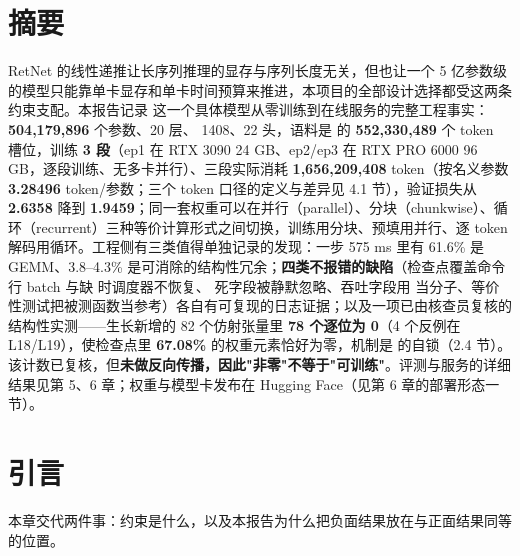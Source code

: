 \documentclass[11pt,openany]{ctexart}
\begin{document}
\clearpage


\section*{摘要}


RetNet 的线性递推让长序列推理的显存与序列长度无关，但也让一个 5 亿参数级的模型只能靠单卡显存和单卡时间预算来推进，本项目的全部设计选择都受这两条约束支配。本报告记录  这一个具体模型从零训练到在线服务的完整工程事实：\textbf{504,179,896} 个参数、20 层、 1408、22 头，语料是  的 \textbf{552,330,489} 个 token 槽位，训练 \textbf{3 段}（ep1 在 RTX 3090 24 GB、ep2/ep3 在 RTX PRO 6000 96 GB，逐段训练、无多卡并行）、三段实际消耗 \textbf{1,656,209,408} token（按名义参数 \textbf{3.28496} token/参数；三个 token 口径的定义与差异见 4.1 节），验证损失从 \textbf{2.6358} 降到 \textbf{1.9459}；同一套权重可以在并行（parallel）、分块（chunkwise）、循环（recurrent）三种等价计算形式之间切换，训练用分块、预填用并行、逐 token 解码用循环。工程侧有三类值得单独记录的发现：一步 575 ms 里有 61.6\allowbreak{}\% 是 GEMM、3.8–4.3\allowbreak{}\% 是可消除的结构性冗余；\textbf{四类不报错的缺陷}（检查点覆盖命令行 batch 与缺  时调度器不恢复、 死字段被静默忽略、吞吐字段用  当分子、等价性测试把被测函数当参考）各自有可复现的日志证据；以及一项已由核查员复核的结构性实测——生长新增的 82 个仿射张量里 \textbf{78 个逐位为 0}（4 个反例在 L18/L19），使检查点里 \textbf{67.08\allowbreak{}\%} 的权重元素恰好为零，机制是  的自锁（2.4 节）。该计数已复核，但\textbf{未做反向传播，因此"非零"不等于"可训练"}。评测与服务的详细结果见第 5、6 章；权重与模型卡发布在 Hugging Face（见第 6 章的部署形态一节）。

\renewcommand{\contentsname}{目录}
\tableofcontents

\clearpage

\section{引言}

本章交代两件事：约束是什么，以及本报告为什么把负面结果放在与正面结果同等的位置。
\end{document}

